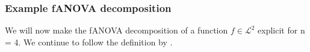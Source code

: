 



\subsubsection*{Example fANOVA decomposition}
We will now make the fANOVA decomposition of a function $f \in \mathcal{L}^2$ explicit for n = 4. We continue to follow the definition by \cite{sobol_global_2001}.


